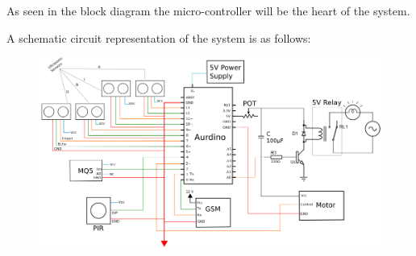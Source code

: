 As seen in the block diagram the micro-controller will be the heart of the system.

A schematic circuit representation of the system is as follows:

\begin{figure}[H]
  \centering
  \includegraphics[width=\textwidth]{schematic-ckt}
\end{figure}
\newpage

